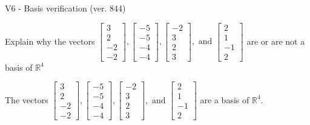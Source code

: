 \begin{exercise}
  \begin{exerciseTitle}V6 - Basis verification (ver. 844)\end{exerciseTitle}
  \begin{exerciseStatement}
    Explain why the vectors \(\left[\begin{array}{r}
3 \\
2 \\
-2 \\
-2
\end{array}\right] , \left[\begin{array}{r}
-5 \\
-5 \\
-4 \\
-4
\end{array}\right] , \left[\begin{array}{r}
-2 \\
3 \\
2 \\
3
\end{array}\right] , \text{ and } \left[\begin{array}{r}
2 \\
1 \\
-1 \\
2
\end{array}\right]\) are or are not a basis of \(\mathbb{R}^4\)	


  \end{exerciseStatement}
  \begin{exerciseAnswer}
   The vectors \(\left[\begin{array}{r}
3 \\
2 \\
-2 \\
-2
\end{array}\right] , \left[\begin{array}{r}
-5 \\
-5 \\
-4 \\
-4
\end{array}\right] , \left[\begin{array}{r}
-2 \\
3 \\
2 \\
3
\end{array}\right] , \text{ and } \left[\begin{array}{r}
2 \\
1 \\
-1 \\
2
\end{array}\right]\) 
  	 are  a basis of \(\mathbb{R}^4\).
  


  \end{exerciseAnswer}
\end{exercise}